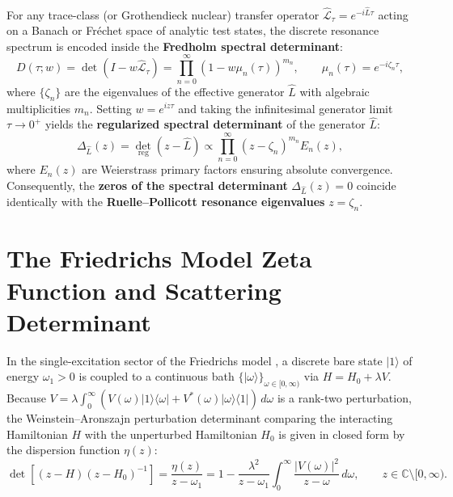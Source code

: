 \documentclass[11pt,a4paper]{article}
\newcommand{\Det}{\operatorname{det}}
\begin{document}
For any trace-class (or Grothendieck nuclear) transfer operator $\widehat{\mathcal{L}}_\tau = e^{-i\widehat{L}\tau}$ acting on a Banach or Fr\'echet space of analytic test states, the discrete resonance spectrum is encoded inside the \textbf{Fredholm spectral determinant}:
\begin{equation}
D(\tau; w) = \Det\left(I - w \widehat{\mathcal{L}}_\tau\right) = \prod_{n=0}^{\infty} \left(1 - w \mu_n(\tau)\right)^{m_n}, \qquad \mu_n(\tau) = e^{-i\zeta_n \tau},
\end{equation}
where $\{\zeta_n\}$ are the eigenvalues of the effective generator $\widehat{L}$ with algebraic multiplicities $m_n$. Setting $w = e^{iz\tau}$ and taking the infinitesimal generator limit $\tau \to 0^+$ yields the \textbf{regularized spectral determinant} of the generator $\widehat{L}$:
\begin{equation}
\Delta_{\widehat{L}}(z) = \Det_{\mathrm{reg}}\left(z - \widehat{L}\right) \propto \prod_{n=0}^{\infty} \left(z - \zeta_n\right)^{m_n} E_n(z),
\end{equation}
where $E_n(z)$ are Weierstrass primary factors ensuring absolute convergence. Consequently, the \textbf{zeros of the spectral determinant} $\Delta_{\widehat{L}}(z) = 0$ coincide identically with the \textbf{Ruelle--Pollicott resonance eigenvalues} $z = \zeta_n$.

\section{The Friedrichs Model Zeta Function and Scattering Determinant}

In the single-excitation sector of the Friedrichs model \cite{Prigogine1977}, a discrete bare state $\lvert 1\rangle$ of energy $\omega_1 > 0$ is coupled to a continuous bath $\{\lvert \omega\rangle\}_{\omega \in [0,\infty)}$ via $H = H_0 + \lambda V$. Because $V = \lambda \int_0^\infty (V(\omega)\lvert 1\rangle\langle \omega\rvert + V^*(\omega)\lvert \omega\rangle\langle 1\rvert)\,d\omega$ is a rank-two perturbation, the Weinstein--Aronszajn perturbation determinant comparing the interacting Hamiltonian $H$ with the unperturbed Hamiltonian $H_0$ is given in closed form by the dispersion function $\eta(z)$:
\begin{equation}
\Det\left[(z - H)(z - H_0)^{-1}\right] = \frac{\eta(z)}{z - \omega_1} = 1 - \frac{\lambda^2}{z - \omega_1}\int_0^\infty \frac{\lvert V(\omega)\rvert^2}{z - \omega}\,d\omega, \qquad z \in \mathbb{C} \setminus [0,\infty).
\end{equation}
\end{document}
